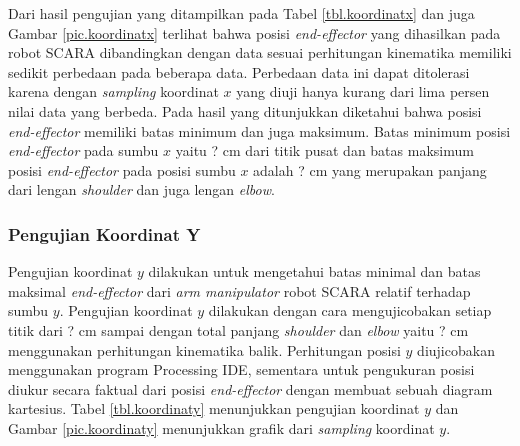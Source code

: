 Dari hasil pengujian yang ditampilkan pada Tabel \ref{tbl.koordinatx} dan juga Gambar \ref{pic.koordinatx} terlihat bahwa posisi \textit{end-effector} yang dihasilkan pada robot SCARA dibandingkan dengan data sesuai perhitungan kinematika memiliki sedikit perbedaan pada beberapa data. Perbedaan data ini dapat ditolerasi karena dengan \textit{sampling} koordinat $x$ yang diuji hanya kurang dari lima persen nilai data yang berbeda. Pada hasil yang ditunjukkan diketahui bahwa posisi \textit{end-effector} memiliki batas minimum dan juga maksimum. Batas minimum posisi \textit{end-effector} pada sumbu $x$ yaitu ? cm dari titik pusat dan batas maksimum posisi \textit{end-effector} pada posisi sumbu $x$ adalah ? cm yang merupakan panjang dari lengan \textit{shoulder} dan juga lengan \textit{elbow}. 

\subsubsection{Pengujian Koordinat Y}
Pengujian koordinat $y$ dilakukan untuk mengetahui batas minimal dan batas maksimal \textit{end-effector} dari \textit{arm manipulator} robot SCARA relatif terhadap sumbu $y$. Pengujian koordinat $y$ dilakukan dengan cara mengujicobakan setiap titik dari ? cm sampai dengan total panjang \textit{shoulder} dan \textit{elbow} yaitu ? cm menggunakan perhitungan kinematika balik. Perhitungan posisi $y$ diujicobakan menggunakan program Processing IDE, sementara untuk pengukuran posisi diukur secara faktual dari posisi \textit{end-effector} dengan membuat sebuah diagram kartesius. Tabel \ref{tbl.koordinaty} menunjukkan pengujian koordinat $y$ dan Gambar \ref{pic.koordinaty} menunjukkan grafik dari \textit{sampling} koordinat $y$.
